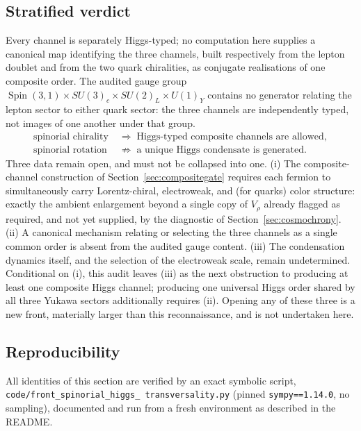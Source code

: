 \documentclass[11pt,a4paper]{article}
\begin{document}
\subsection{Stratified verdict}
\label{sec:higgsverdict}

Every channel is separately Higgs-typed; no computation here supplies a canonical map identifying the
three channels, built respectively from the lepton doublet and from the two quark chiralities, as
conjugate realisations of one composite order.
The audited gauge group $\operatorname{Spin}(3,1) \times SU(3)_c \times SU(2)_L \times U(1)_Y$
contains no generator relating the lepton sector to either quark sector: the three channels are
independently typed, not images of one another under that group.
\begin{equation}
\boxed{
\begin{aligned}
\text{spinorial chirality} &\;\Longrightarrow\; \text{Higgs-typed composite channels are allowed},\\
\text{spinorial rotation} &\;\not\Longrightarrow\; \text{a unique Higgs condensate is generated}.
\end{aligned}}
\label{eq:higgsverdict}
\end{equation}
Three data remain open, and must not be collapsed into one.
(i) The composite-channel construction of Section~\ref{sec:compositegate} requires each fermion to
simultaneously carry Lorentz-chiral, electroweak, and (for quarks) color structure: exactly the
ambient enlargement beyond a single copy of $V_\rho$ already flagged as required, and not yet
supplied, by the diagnostic of Section~\ref{sec:cosmochrony}.
(ii) A canonical mechanism relating or selecting the three channels as a single common order is
absent from the audited gauge content.
(iii) The condensation dynamics itself, and the selection of the electroweak scale, remain
undetermined.
Conditional on (i), this audit leaves (iii) as the next obstruction to producing at least one
composite Higgs channel; producing one universal Higgs order shared by all three Yukawa sectors
additionally requires (ii).
Opening any of these three is a new front, materially larger than this reconnaissance, and is not
undertaken here.

\subsection{Reproducibility}
\label{sec:reproducibility}

All identities of this section are verified by an exact symbolic script,
\texttt{code/\allowbreak front\_\allowbreak spinorial\_\allowbreak higgs\_\allowbreak
transversality.py} (pinned \texttt{sympy==1.14.0}, no sampling), documented and run from a fresh
environment as described in the README.
\end{document}
